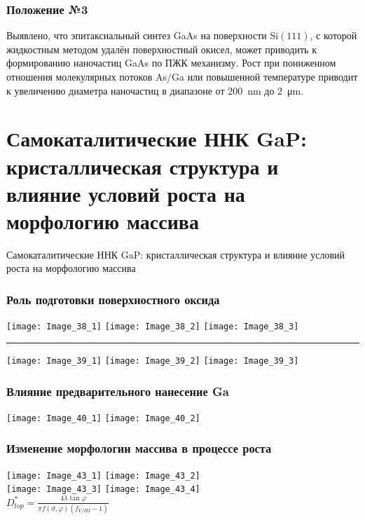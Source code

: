 \begin{frame}
	\frametitle{Положение №3}
	\large
	Выявлено, что эпитаксиальный синтез GaAs на поверхности Si\((111)\), с
	которой жидкостным методом удалён поверхностный окисел, может приводить к
	формированию наночастиц GaAs по ПЖК механизму. Рост при пониженном отношения
	молекулярных потоков As/Ga или повышенной температуре приводит к увеличению
	диаметра наночастиц в диапазоне от 200~\si{\nano\metre} до
2~\si{\micro\metre}.
\end{frame}

\section{Самокаталитические ННК GaP: кристаллическая структура и влияние условий роста на морфологию массива}

\begin{frame}
	\begin{center}
		\Huge
		Самокаталитические ННК GaP: кристаллическая структура и влияние условий роста на морфологию массива
	\end{center}
\end{frame}

\begin{frame}
	\frametitle{Роль подготовки поверхностного оксида}
	\centering
	\hfill
	\texttt{[image: Image\_38\_1]}
	\hfill
	\texttt{[image: Image\_38\_2]}
	\hfill
	\texttt{[image: Image\_38\_3]}
	\hfill
	\bigskip
	\hrule{}
	\bigskip
	\hfill
	\texttt{[image: Image\_39\_1]}
	\hfill
	\texttt{[image: Image\_39\_2]}
	\hfill
	\texttt{[image: Image\_39\_3]}
	\hfill
\end{frame}

\begin{frame}
	\frametitle{Влияние предварительного нанесение Ga}
	\centering
	\texttt{[image: Image\_40\_1]}
	\texttt{[image: Image\_40\_2]}
\end{frame}


\begin{frame}
	\frametitle{Изменение морфологии массива в процессе роста}
	\centering
	\texttt{[image: Image\_43\_1]}
	\texttt{[image: Image\_43\_2]}
	\\
	\texttt{[image: Image\_43\_3]}
	\texttt{[image: Image\_43\_4]}
	\\[5pt]
	\(D_{top}^\ast=\frac{4 \lambda \tan{\varphi}}{\pi f(\vartheta,\varphi)(f_{V/III}-1)}\)
\end{frame}


